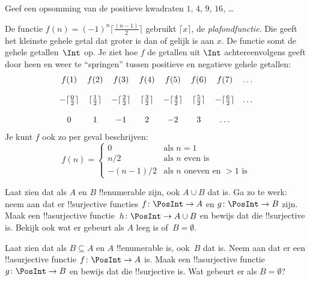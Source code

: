 \documentclass[openany]{memoir}
\begin{document}
\begin{prob}
Geef een opsomming van de positieve kwadraten $1$, $4$, $9$, $16$, \dots
\end{prob}

\begin{ex}
De functie $f(n) = (-1)^{n} \lceil \frac{(n-1)}{2}\rceil$ gebruikt
$\lceil x \rceil$, de \emph{plafondfunctie}. Die geeft het kleinste
gehele getal dat groter is dan of gelijk is aan $x$. De functie somt
de gehele getallen~$\Int$ op. Je ziet hoe $f$ de getallen uit $\Int$
achtereenvolgens geeft door heen en weer te ``springen'' tussen positieve en negatieve
gehele getallen:
\[
\begin{array}{c c c c c c c c}
f(1) & f(2) & f(3) & f(4) & f(5) & f(6) & f(7) & \dots \\ \\
- \lceil \tfrac{0}{2} \rceil & \lceil \tfrac{1}{2}\rceil & - \lceil \tfrac{2}{2} \rceil & \lceil \tfrac{3}{2} \rceil & - \lceil \tfrac{4}{2} \rceil  & \lceil \tfrac{5}{2}
\rceil & - \lceil \tfrac{6}{2} \rceil & \dots \\ \\
0 & 1 & -1 & 2 & -2 & 3 & \dots
\end{array}
\]
Je kunt $f$ ook zo per geval beschrijven:
\[
f(n) = \begin{cases}
  0 & \text{als $n = 1$}\\
  n/2 & \text{als $n$ even is}\\
  -(n-1)/2 & \text{als $n$ oneven en $>1$ is}
  \end{cases}
\]
\end{ex}

\begin{prob}
  Laat zien dat als $A$ en $B$ !!{enumerable} zijn, ook $A \cup B$ dat
  is. Ga zo te werk: neem aan dat er !!{surjective} functies
  $f\colon \PosInt \to A$ en $g\colon \PosInt \to B$ zijn. Maak een
  !!a{surjective} functie~$h\colon \PosInt \to A \cup B$ en bewijs dat
  die !!{surjective} is. Bekijk ook wat er gebeurt als $A$ leeg is
  of~$B = \emptyset$.
\end{prob}
  
\begin{prob}
  Laat zien dat als $B \subseteq A$ en $A$ !!{enumerable} is, ook~$B$
  dat is. Neem aan dat er een !!a{surjective} functie
  $f\colon \PosInt \to A$ is. Maak een !!a{surjective} functie
  $g\colon \PosInt \to B$ en bewijs dat die !!{surjective} is. Wat
  gebeurt er als $B = \emptyset$?
\end{prob}
    
\end{document}
